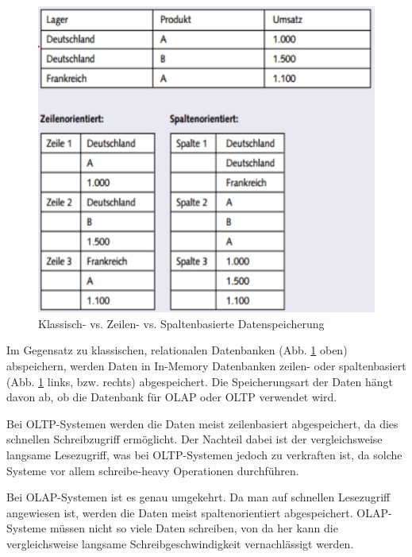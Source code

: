 \documentclass[a4paper, 11pt, nofootinbib]{article}
\begin{document}
\begin{figure}
	\centering
	\includegraphics[keepaspectratio=true,height=15\baselineskip]{zeilenVsSpalten.jpg}
	\caption{Klassisch- vs. Zeilen- vs. Spaltenbasierte Datenspeicherung}
	\label{fig:zeilenVsSpalten}
\end{figure}

Im Gegensatz zu klassischen, relationalen Datenbanken (Abb. \ref{fig:zeilenVsSpalten} oben) abspeichern, werden Daten in In-Memory Datenbanken zeilen- oder spaltenbasiert (Abb. \ref{fig:zeilenVsSpalten} links, bzw. rechts) abgespeichert. Die Speicherungsart der Daten hängt davon ab, ob die Datenbank für OLAP oder OLTP verwendet wird.

\vspace{10px}

\noindent Bei OLTP-Systemen werden die Daten meist zeilenbasiert abgespeichert, da dies schnellen Schreibzugriff ermöglicht. Der Nachteil dabei ist der vergleichsweise langsame Lesezugriff, was bei OLTP-Systemen jedoch zu verkraften ist, da solche Systeme vor allem schreibe-heavy Operationen durchführen.

Bei OLAP-Systemen ist es genau umgekehrt. Da man auf schnellen Lesezugriff angewiesen ist, werden die Daten meist spaltenorientiert abgespeichert. OLAP-Systeme müssen nicht so viele Daten schreiben, von da her kann die vergleichsweise langsame Schreibgeschwindigkeit vernachlässigt werden.

\newpage
\end{document}
